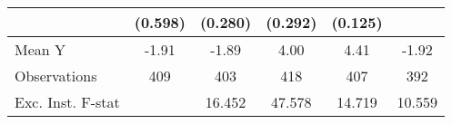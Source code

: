 {\begin{tabular}{l*{5}{c}}
            &     (0.598)         &     (0.280)         &     (0.292)         &     (0.125)         &                     \\
\midrule
Mean Y      &       -1.91         &       -1.89         &        4.00         &        4.41         &       -1.92         \\
Observations&         409         &         403         &         418         &         407         &         392         \\
Exc. Inst. F-stat&                     &      16.452         &      47.578         &      14.719         &      10.559         \\
\bottomrule
\end{tabular}
}
